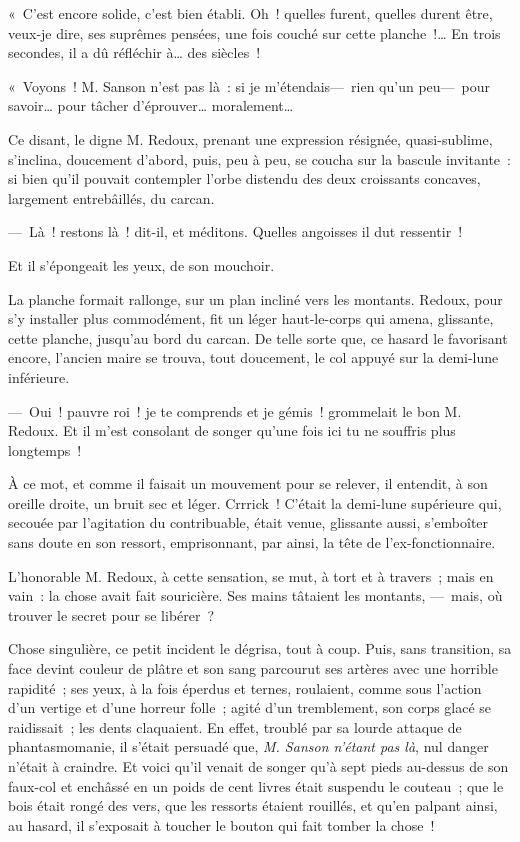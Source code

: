 \documentclass[french,twoside]{book} %
\begin{document}
« C’est encore solide, c’est bien établi. Oh ! quelles furent, quelles durent être, veux-je dire, ses suprêmes pensées, une fois couché sur cette planche !… En trois secondes, il a dû réfléchir à… des siècles !\par
   « Voyons ! M. Sanson n’est pas là : si je m’étendais— rien qu’un peu— pour savoir… pour tâcher d’éprouver… moralement…\par
Ce disant, le digne M. Redoux, prenant une expression résignée, quasi-sublime, s’inclina, doucement d’abord, puis, peu à peu, se coucha sur la bascule invitante : si bien qu’il pouvait contempler l’orbe distendu des deux croissants concaves, largement entrebâillés, du carcan.\par
— Là ! restons là ! dit-il, et méditons. Quelles angoisses il dut ressentir !\par
Et il s’épongeait les yeux, de son mouchoir.\par
La planche formait rallonge, sur un plan incliné vers les montants. Redoux, pour s’y installer plus commodément, fit un léger haut-le-corps qui amena, glissante, cette planche, jusqu’au bord du carcan. De telle sorte que, ce hasard le favorisant encore, l’ancien maire se trouva, tout doucement, le col appuyé sur la demi-lune inférieure.\par
— Oui ! pauvre roi ! je te comprends et je gémis ! grommelait le bon M. Redoux. Et il m’est   consolant de songer qu’une fois ici tu ne souffris plus longtemps !\par
À ce mot, et comme il faisait un mouvement pour se relever, il entendit, à son oreille droite, un bruit sec et léger. Crrrick ! C’était la demi-lune supérieure qui, secouée par l’agitation du contribuable, était venue, glissante aussi, s’emboîter sans doute en son ressort, emprisonnant, par ainsi, la tête de l’ex-fonctionnaire.\par
L’honorable M. Redoux, à cette sensation, se mut, à tort et à travers ; mais en vain : la chose avait fait souricière. Ses mains tâtaient les montants, — mais, où trouver le secret pour se libérer ?\par
Chose singulière, ce petit incident le dégrisa, tout à coup. Puis, sans transition, sa face devint couleur de plâtre et son sang parcourut ses artères avec une horrible rapidité ; ses yeux, à la fois éperdus et ternes, roulaient, comme sous l’action d’un vertige et d’une horreur folle ; agité d’un tremblement, son corps glacé se raidissait ; les dents claquaient. En effet, troublé par sa lourde attaque de phantasmomanie, il   s’était persuadé que, \emph{M. Sanson n’étant pas là}, nul danger n’était à craindre. Et voici qu’il venait de songer qu’à sept pieds au-dessus de son faux-col et enchâssé en un poids de cent livres était suspendu le couteau ; que le bois était rongé des vers, que les ressorts étaient rouillés, et qu’en palpant ainsi, au hasard, il s’exposait à toucher le bouton qui fait tomber la chose !\par
\end{document}
